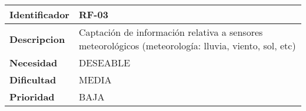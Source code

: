 \begin{center}
    \begin{tabular}{|p{2.6cm}|p{12cm}|}
    \hline
    \textbf{Identificador} & RF-03\\
    \hline
    \textbf{Descripcion} & Captación de información relativa a sensores meteorológicos (meteorología: lluvia, viento, sol, etc)\\
    \hline
    \textbf{Necesidad} & DESEABLE\\
    \hline
    \textbf{Dificultad} & MEDIA\\
    \hline
    \textbf{Prioridad} & BAJA\\
    \hline
    \end{tabular}
\end{center}
